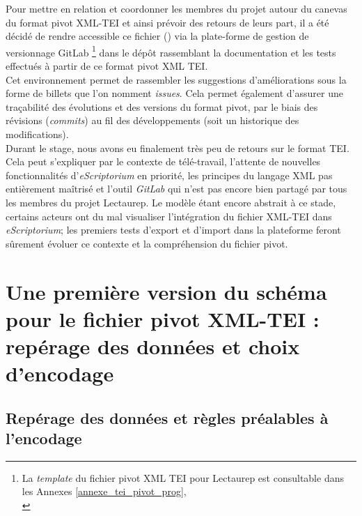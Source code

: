 
Pour mettre en relation et coordonner les membres du projet autour du canevas du format pivot XML-TEI et ainsi prévoir des retours de leurs part, il a été décidé de rendre accessible ce fichier () via la plate-forme de gestion de versionnage GitLab \footnote{La \textit{template} du fichier pivot XML TEI pour Lectaurep est consultable dans les Annexes \ref{annexe_tei_pivot_prog},\\ } dans le dépôt rassemblant la documentation et les tests effectués à partir de ce format pivot XML TEI.\\

Cet environnement permet de rassembler les suggestions d'améliorations sous la forme de billets que l'on nomment \textit{issues}. Cela permet également d'assurer une traçabilité des évolutions et des versions du format pivot, par le biais des révisions (\textit{commits}) au fil des développements (soit un historique des modifications).\\

Durant le stage, nous avons eu finalement très peu de retours sur le format TEI. Cela peut s'expliquer par le contexte de télé-travail, l'attente de nouvelles fonctionnalités d'\textit{eScriptorium} en priorité, les principes du langage XML pas entièrement maîtrisé  et l'outil \textit{GitLab} qui n'est pas encore bien partagé par tous les membres du projet Lectaurep. Le modèle étant encore abstrait à ce stade, certains acteurs ont du mal visualiser l'intégration du fichier XML-TEI dans \textit{eScriptorium}; les premiers tests d'export et d'import dans la plateforme feront sûrement évoluer ce contexte et la compréhension du fichier pivot. 

\section{Une première version du schéma pour le fichier pivot XML-TEI : repérage des données et choix d'encodage}

\subsection{Repérage des données et règles préalables à l'encodage}


